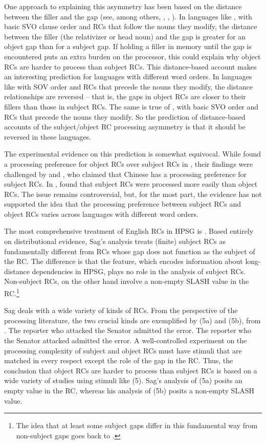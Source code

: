 \documentclass[a4paper]{article}
\begin{document}
One approach to explaining this asymmetry has been based on the distance between the filler and the gap (see, among others, \citet{WannerMaratsos78}, \citet{Gibson98a}, \citet{Hawkins2004a-u}).  In languages like , with basic SVO clause order and RCs that follow the nouns they modify, the distance between the filler (the relativizer or head noun) and the gap is greater for an object gap than for a subject gap.  If holding a filler in memory until the gap is encountered puts an extra burden on the processor, this could explain why object RCs are harder to process than subject RCs.   This distance-based account makes an interesting prediction for languages with different word orders.  In languages like  with SOV order and RCs that precede the nouns they modify, the distance relationships are reversed -- that is, the gaps in object RCs are closer to their fillers than those in subject RCs.  The same is true of , with basic SVO order and RCs that precede the nouns they modify.  So the prediction of distance-based accounts of the subject/object RC processing asymmetry is that it should be reversed in these languages.

The experimental evidence on this prediction is somewhat equivocal.  While \citet{HsiaoGibson03} found a processing preference for object RCs over subject RCs in , their findings were challenged by \citet{LinBever2006} and \citet{VasishthEtal2013}, who claimed that Chinese has a processing preference for subject RCs.  In , \citet{MiyamotoNakamura2003} found that subject RCs were processed more easily than object RCs.  The issue remains controversial, but, for the most part, the evidence has not supported the idea that the processing preference between subject RCs and object RCs varies across languages with different word orders.

The most comprehensive treatment of English RCs in HPSG is \citet{Sag97a}. Based entirely on distributional evidence, Sag's analysis treats (finite) subject RCs as fundamentally different from RCs whose gap does not function as the subject of the RC.  The difference is that the  feature, which encodes information about long-distance dependencies in HPSG, plays no role in the analysis of subject RCs.  Non-subject RCs, on the other hand involve a non-empty SLASH value in the RC.\footnote{The idea that at least some subject gaps differ in this fundamental way from non-subject gaps goes back to \citet{Gazdar81}.}   

Sag deals with a wide variety of kinds of RCs. From the perspective of the processing literature, the two crucial kinds are exemplified by (5a) and (5b), from \citet{Gibson98a}.
\eal
\ex The reporter who attacked the Senator admitted the error.
\ex The reporter who the Senator attacked admitted the error.
\zl
A well-controlled experiment on the processing complexity of subject and object RCs must have stimuli that are matched in every respect except the role of the gap in the RC.  Thus, the conclusion that object RCs are harder to process than subject RCs is based on a wide variety of studies using stimuli like (5).  Sag's analysis of (5a) posits an empty  value in the RC, whereas his analysis of (5b) posits a non-empty SLASH value.  
\end{document}
